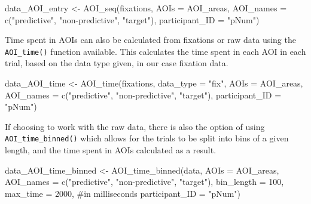 \documentclass[
  man,
  floatsintext,
  longtable,
  nolmodern,
  notxfonts,
  notimes,
  colorlinks=true,linkcolor=blue,citecolor=blue,urlcolor=blue]{apa7}
\newenvironment{Shaded}{\begin{snugshade}}{\end{snugshade}}
\newcommand{\AttributeTok}[1]{\textcolor[rgb]{0.40,0.45,0.13}{#1}}
\newcommand{\CommentTok}[1]{\textcolor[rgb]{0.37,0.37,0.37}{#1}}
\newcommand{\DecValTok}[1]{\textcolor[rgb]{0.68,0.00,0.00}{#1}}
\newcommand{\FunctionTok}[1]{\textcolor[rgb]{0.28,0.35,0.67}{#1}}
\newcommand{\NormalTok}[1]{\textcolor[rgb]{0.00,0.23,0.31}{#1}}
\newcommand{\OtherTok}[1]{\textcolor[rgb]{0.00,0.23,0.31}{#1}}
\newcommand{\StringTok}[1]{\textcolor[rgb]{0.13,0.47,0.30}{#1}}
\begin{document}
\begin{Shaded}
\begin{Highlighting}[]
\NormalTok{data\_AOI\_entry }\OtherTok{\textless{}{-}} \FunctionTok{AOI\_seq}\NormalTok{(fixations, }\AttributeTok{AOIs =}\NormalTok{ AOI\_areas,}
                          \AttributeTok{AOI\_names =} \FunctionTok{c}\NormalTok{(}\StringTok{"predictive"}\NormalTok{, }\StringTok{"non{-}predictive"}\NormalTok{, }\StringTok{"target"}\NormalTok{),}
                          \AttributeTok{participant\_ID =} \StringTok{"pNum"}\NormalTok{)}
\end{Highlighting}
\end{Shaded}

Time spent in AOIs can also be calculated from fixations or raw data
using the \texttt{AOI\_time()} function available. This calculates the
time spent in each AOI in each trial, based on the data type given, in
our case fixation data.

\begin{Shaded}
\begin{Highlighting}[]
\NormalTok{data\_AOI\_time }\OtherTok{\textless{}{-}} \FunctionTok{AOI\_time}\NormalTok{(fixations, }\AttributeTok{data\_type =} \StringTok{"fix"}\NormalTok{, }\AttributeTok{AOIs =}\NormalTok{ AOI\_areas,}
                          \AttributeTok{AOI\_names =} \FunctionTok{c}\NormalTok{(}\StringTok{"predictive"}\NormalTok{, }\StringTok{"non{-}predictive"}\NormalTok{, }\StringTok{"target"}\NormalTok{),}
                          \AttributeTok{participant\_ID =} \StringTok{"pNum"}\NormalTok{)}
\end{Highlighting}
\end{Shaded}

If choosing to work with the raw data, there is also the option of using
\texttt{AOI\_time\_binned()} which allows for the trials to be split
into bins of a given length, and the time spent in AOIs calculated as a
result.

\begin{Shaded}
\begin{Highlighting}[]
\NormalTok{data\_AOI\_time\_binned }\OtherTok{\textless{}{-}} \FunctionTok{AOI\_time\_binned}\NormalTok{(data, }\AttributeTok{AOIs =}\NormalTok{ AOI\_areas,}
                                        \AttributeTok{AOI\_names =} \FunctionTok{c}\NormalTok{(}\StringTok{"predictive"}\NormalTok{, }\StringTok{"non{-}predictive"}\NormalTok{, }\StringTok{"target"}\NormalTok{),}
                                        \AttributeTok{bin\_length =} \DecValTok{100}\NormalTok{,}
                                        \AttributeTok{max\_time =} \DecValTok{2000}\NormalTok{, }\CommentTok{\#in milliseconds}
                                        \AttributeTok{participant\_ID =} \StringTok{"pNum"}\NormalTok{)}
\end{Highlighting}
\end{Shaded}
\end{document}
